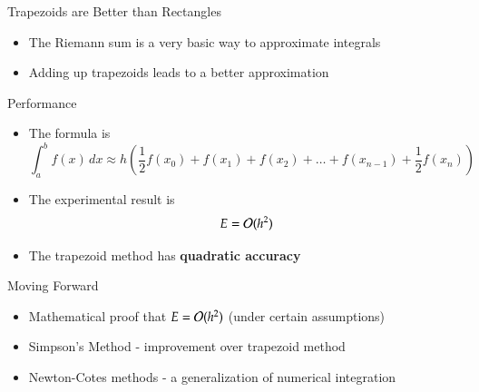 \documentclass[10pt]{beamer}
\begin{document}
\begin{frame}{Trapezoids are Better than Rectangles}
\begin{center}
\end{center}
\begin{itemize}
    \item The Riemann sum is a very basic way to approximate integrals 
    \item Adding up trapezoids leads to a better approximation
\end{itemize}
\end{frame}

\begin{frame}{Performance}

\begin{itemize}
    \item The formula is 
    $$
    \int_a^b f(x)\,dx \approx    h    \left(\frac{1}{2} f(x_0) +   f(x_1) +  f(x_2) + \dots +   f(x_{n-1}) + \frac{1}{2} f(x_n)\right)
    $$
    \item The experimental result is 
    $$
        E = {\mathcal{O}}(h^2)
    $$

    \item The trapezoid method has \textbf{quadratic accuracy}
\end{itemize}
    
\end{frame}


\begin{frame}{Moving Forward}
\begin{itemize}
    \item Mathematical proof that $E={\mathcal{O}}(h^2)$ (under certain assumptions)
        \vfill 
    \item Simpson's Method - improvement over trapezoid method
        \vfill 
    \item Newton-Cotes methods - a generalization of numerical integration
    \vfill 
\end{itemize}
\end{frame}
\end{document}
